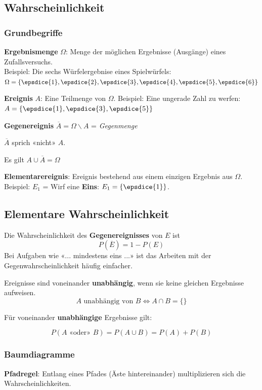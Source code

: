 \begin{multicols}{2}


\subsection*{Wahrscheinlichkeit}
\subsubsection*{Grundbegriffe}

\textbf{Ergebnismenge} $\Omega$: Menge der möglichen Ergebnisse
(Ausgänge) eines Zufallsversuchs.\\
Beispiel: Die sechs Würfelergebnise
eines Spielwürfels: $\Omega = \{\epsdice{1}, \epsdice{2}, \epsdice{3}, \epsdice{4}, \epsdice{5}, \epsdice{6}\}$

\textbf{Ereignis} $A$: Eine Teilmenge von $\Omega$. Beispiel: Eine
ungerade Zahl zu werfen: $A  = \{\epsdice{1}, \epsdice{3}, \epsdice{5}\}$

\textbf{Gegenereignis} $\overline{A} = \Omega \backslash A$ =
\textit{Gegenmenge}

$\overline{A}$ sprich «nicht» $A$.

Es gilt $A \cup \overline{A} = \Omega$

\textbf{Elementarereignis}: Ereignis bestehend aus einem einzigen
Ergebnis aus $\Omega$. Beispiel: $E_1$ = Wirf eine \textbf{Eins}: $E_1
= \{\epsdice{1}\}$.


\subsection*{Elementare Wahrscheinlichkeit}
Die Wahrscheinlichkeit des \textbf{Gegenereignisses} von $E$ ist
$$P(\overline{E}) = 1- P(E)$$
Bei Aufgaben wie «... mindestens eins ...» ist das Arbeiten mit der
Gegenwahrscheinlichkeit häufig einfacher.

Ereignisse sind voneinander \textbf{unabhängig}, wenn sie keine
gleichen Ergebnisse aufweisen.
$$A \textrm{ unabhängig von } B \Leftrightarrow A\cap B=\{\}$$

Für voneinander \textbf{unabhängige} Ergebnisse 
gilt:

$$P(A\textrm{ «oder» }B) = P(A\cup B) = P(A) + P(B)$$


\subsubsection*{Baumdiagramme}

\textbf{Pfadregel}:
Entlang eines Pfades (Äste hintereinander) multiplizieren sich die
Wahrscheinlichkeiten.


\end{multicols}
